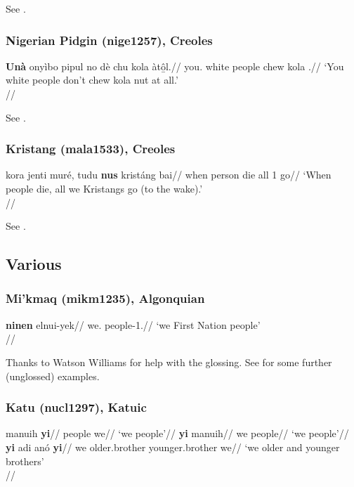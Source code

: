 See \citet[224, 460, 466f.]{huttarhuttar1994}.

\subsubsection{Nigerian Pidgin (nige1257), Creoles}

\ex \begingl
\gla \textbf{Unà} onyìbo pipul no dè chu kola àt\b{ô}l.//
\glb you.\Pl{} white people \Neg{} \Ipfv{} chew kola \Neg.\Emph{}//
\glft `You white people don't chew kola nut at all.'\\\citep[after][181, (802)]{faraclas1996}//
\endgl
\xe

See \citet[178, 181]{faraclas1996}.

\subsubsection{Kristang (mala1533), Creoles}

\ex
\begingl
\gla  kora jenti muré, tudu \textbf{nus} kristáng bai//
\glb when person die all 1\Pl{} {} go//
\glft `When people die, all we Kristangs go (to the wake).' \\\citep[86, (11)]{baxter1988}//
\endgl
\xe

See \citet[86]{baxter1988}.


\subsection{Various}


\subsubsection{Mi'kmaq (mikm1235), Algonquian}

\ex
\begingl
\gla \textbf{ninen} elnui-yek//
\glb we.\Excl{} people-1\Pl.\Excl//
\glft `we First Nation people'\\
\citep[188]{pacifiqueetal1990}//
\endgl
\xe

Thanks to Watson Williams for help with the glossing.
See \citet[188]{pacifiqueetal1990} for some further (unglossed) examples.

\subsubsection{Katu (nucl1297), Katuic}

\pex
\a \begingl
\gla manuih \textbf{yi}//
\glb people we//
\glft `we people'//
\endgl
\a 
\begingl
\gla \textbf{yi} manuih//
\glb we people//
\glft `we people'//
\endgl
\a
\begingl
\gla \textbf{yi} adi anó \textbf{yi}//
\glb we older.brother younger.brother we//
\glft `we older and younger brothers'\\
\citep[28, (35--37)]{costello1969}//
\endgl
\xe

